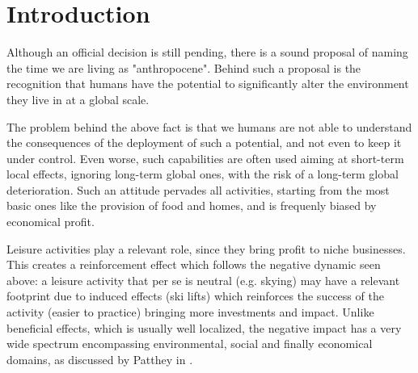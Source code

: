 \documentclass[sustainability,article,submit,pdftex,moreauthors]{Definitions/mdpi}
\begin{document}






\section{Introduction}

Although an official decision is still pending, there is a sound proposal of naming the time we are living as "anthropocene". Behind such a proposal is the recognition that humans have the potential to significantly alter the environment they live in at a global scale.

The problem behind the above fact is that we humans are not able to understand the consequences of the deployment of such a potential, and not even to keep it under control. Even worse, such capabilities are often used aiming at short-term local effects, ignoring long-term global ones, with the risk of a long-term global deterioration. Such an attitude pervades all activities, starting from the most basic ones like the provision of food and homes, and is frequenly biased by economical profit.

Leisure activities play a relevant role, since they bring profit to niche businesses. This creates a reinforcement effect which follows the negative dynamic seen above: a leisure activity that per se is neutral (e.g. skying) may have a relevant footprint due to induced effects (ski lifts) which reinforces the success of the activity (easier to practice) bringing more investments and impact. Unlike beneficial effects, which is usually well localized, the negative impact has a very wide spectrum encompassing environmental, social and finally economical domains, as discussed by Patthey in \cite{pat08a}.
\end{document}

